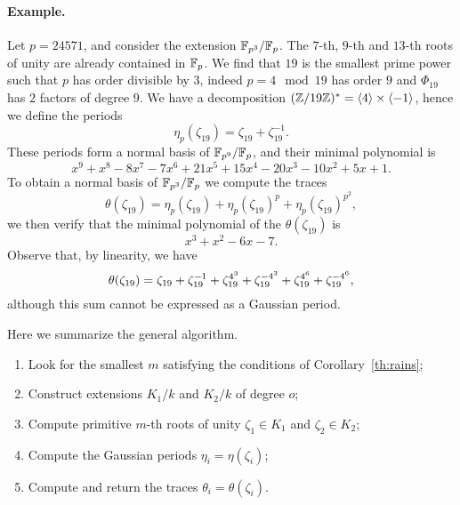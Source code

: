 \documentclass{article}
\begin{document}
\paragraph{Example.} Let $p=24571$, and consider the extension
$\mathbb{F}_{p^3}/\mathbb{F}_p$. The $7$-th, $9$-th and $13$-th roots of unity are
already contained in $\mathbb{F}_p$. We find that $19$ is the smallest prime
power such that $p$ has order divisible by $3$, indeed $p=4\mod 19$
has order $9$ and $\Phi_{19}$ has $2$ factors of degree $9$. We have
a decomposition
$(\mathbb{Z}/19\mathbb{Z})^\ast=\langle4\rangle\times\langle-1\rangle$, hence we
define the periods
\begin{equation}
  \eta_p(\zeta_{19}) = \zeta_{19} + \zeta_{19}^{-1}.
\end{equation}
These periods form a normal basis of $\mathbb{F}_{p^9}/\mathbb{F}_p$, and their
minimal polynomial is
\begin{equation}
  x^9 + x^8 - 8x^7 - 7x^6 + 21x^5 +
  15x^4 - 20x^3 - 10x^2 + 5x + 1.
\end{equation}
To obtain a normal basis of $\mathbb{F}_{p^3}/\mathbb{F}_p$ we compute the traces
\begin{equation}
  \theta(\zeta_{19}) = \eta_p(\zeta_{19}) + \eta_p(\zeta_{19})^p + \eta_p(\zeta_{19})^{p^2},
\end{equation}
we then verify that the minimal polynomial of the $\theta(\zeta_{19})$ is 
\begin{equation}
  x^3 + x^2 - 6x - 7.
\end{equation}
Observe that, by linearity, we have
\begin{equation}
  \def\z{\zeta_{19}}
  \theta(\zeta_{19}) = \z + \z^{-1} + \z^{4^3} + \z^{-4^3} + \z^{4^6} + \z^{-4^6},
\end{equation}
although this sum cannot be expressed as a Gaussian period.

Here we summarize the general algorithm.

\begin{enumerate}
\item Look for the smallest $m$ satisfying the conditions of
  Corollary~\ref{th:rains};
\item Construct extensions $K_1/k$ and $K_2/k$ of degree $o$;
\item Compute primitive $m$-th roots of unity $\zeta_1\in K_1$ and
  $\zeta_2\in K_2$;
\item Compute the Gaussian periods $\eta_i=\eta(\zeta_i)$;
\item Compute and return the traces $\theta_i=\theta(\zeta_i)$.
\end{enumerate}
\end{document}
